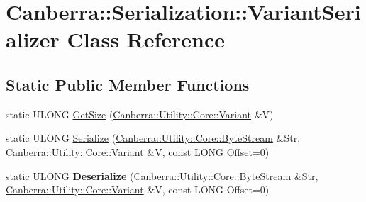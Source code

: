 \hypertarget{class_canberra_1_1_serialization_1_1_variant_serializer}{}\section{Canberra\+:\+:Serialization\+:\+:Variant\+Serializer Class Reference}
\label{class_canberra_1_1_serialization_1_1_variant_serializer}
\subsection*{Static Public Member Functions}
\begin{DoxyCompactItemize}
\item 
static U\+L\+O\+NG \hyperlink{class_canberra_1_1_serialization_1_1_variant_serializer_aa1a72bee045b32010855cb3d1070bc3a_aa1a72bee045b32010855cb3d1070bc3a}{Get\+Size} (\hyperlink{class_canberra_1_1_utility_1_1_core_1_1_variant}{Canberra\+::\+Utility\+::\+Core\+::\+Variant} \&V)
\item 
static U\+L\+O\+NG \hyperlink{class_canberra_1_1_serialization_1_1_variant_serializer_a0f428f6b680c3883c4a678d60a3e9a10_a0f428f6b680c3883c4a678d60a3e9a10}{Serialize} (\hyperlink{class_canberra_1_1_utility_1_1_core_1_1_byte_stream}{Canberra\+::\+Utility\+::\+Core\+::\+Byte\+Stream} \&Str, \hyperlink{class_canberra_1_1_utility_1_1_core_1_1_variant}{Canberra\+::\+Utility\+::\+Core\+::\+Variant} \&V, const L\+O\+NG Offset=0)
\item 
\mbox{\label{class_canberra_1_1_serialization_1_1_variant_serializer_aed68ead8753ed5bf2716af9fa05550a3}} 
static U\+L\+O\+NG {\bfseries Deserialize} (\hyperlink{class_canberra_1_1_utility_1_1_core_1_1_byte_stream}{Canberra\+::\+Utility\+::\+Core\+::\+Byte\+Stream} \&Str, \hyperlink{class_canberra_1_1_utility_1_1_core_1_1_variant}{Canberra\+::\+Utility\+::\+Core\+::\+Variant} \&V, const L\+O\+NG Offset=0)
\end{DoxyCompactItemize}
